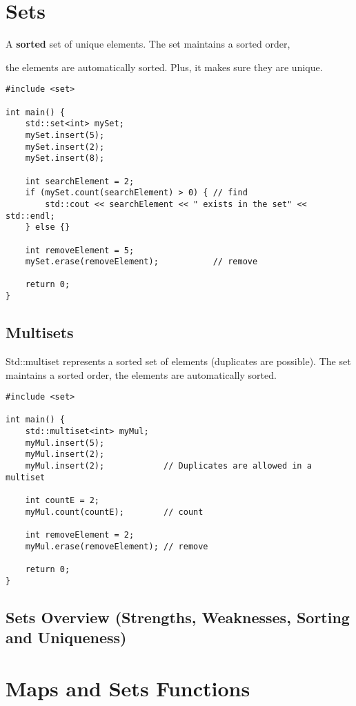 \section{Sets}

A \textbf{sorted} set of unique elements. The set maintains a sorted order,

the elements are automatically sorted. Plus, it makes sure they are unique.

\begin{verbatim}
#include <set>

int main() {
    std::set<int> mySet;
    mySet.insert(5);
    mySet.insert(2);
    mySet.insert(8);

    int searchElement = 2;
    if (mySet.count(searchElement) > 0) { // find
        std::cout << searchElement << " exists in the set" << std::endl;
    } else {}

    int removeElement = 5;
    mySet.erase(removeElement);           // remove

    return 0;
}
\end{verbatim}

\subsection{Multisets}

Std::multiset represents a sorted set of elements (duplicates are possible). The set maintains a sorted order,
the elements are automatically sorted.

\begin{verbatim}
#include <set>

int main() {
    std::multiset<int> myMul;
    myMul.insert(5);
    myMul.insert(2);
    myMul.insert(2);            // Duplicates are allowed in a multiset

    int countE = 2;
    myMul.count(countE);        // count

    int removeElement = 2;
    myMul.erase(removeElement); // remove

    return 0;
}
\end{verbatim}

\subsection{Sets Overview (Strengths, Weaknesses, Sorting and Uniqueness)}

\section{Maps and Sets Functions}

